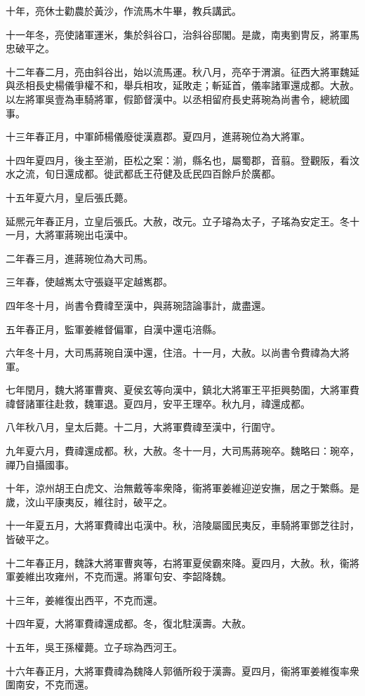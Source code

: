 \begin{pinyinscope}
十年，亮休士勸農於黃沙，作流馬木牛畢，教兵講武。

十一年冬，亮使諸軍運米，集於斜谷口，治斜谷邸閣。是歲，南夷劉冑反，將軍馬忠破平之。

十二年春二月，亮由斜谷出，始以流馬運。秋八月，亮卒于渭濵。征西大將軍魏延與丞相長史楊儀爭權不和，舉兵相攻，延敗走；斬延首，儀率諸軍還成都。大赦。以左將軍吳壹為車騎將軍，假節督漢中。以丞相留府長史蔣琬為尚書令，總統國事。

十三年春正月，中軍師楊儀廢徙漢嘉郡。夏四月，進蔣琬位為大將軍。

十四年夏四月，後主至湔，臣松之案：湔，縣名也，屬蜀郡，音翦。登觀阪，看汶水之流，旬日還成都。徙武都氐王苻健及氐民四百餘戶於廣都。

十五年夏六月，皇后張氏薨。

延熈元年春正月，立皇后張氏。大赦，改元。立子璿為太子，子瑤為安定王。冬十一月，大將軍蔣琬出屯漢中。

二年春三月，進蔣琬位為大司馬。

三年春，使越嶲太守張嶷平定越嶲郡。

四年冬十月，尚書令費禕至漢中，與蔣琬諮論事計，歲盡還。

五年春正月，監軍姜維督偏軍，自漢中還屯涪縣。

六年冬十月，大司馬蔣琬自漢中還，住涪。十一月，大赦。以尚書令費禕為大將軍。

七年閏月，魏大將軍曹爽、夏侯玄等向漢中，鎮北大將軍王平拒興勢圍，大將軍費禕督諸軍往赴救，魏軍退。夏四月，安平王理卒。秋九月，禕還成都。

八年秋八月，皇太后薨。十二月，大將軍費禕至漢中，行圍守。

九年夏六月，費禕還成都。秋，大赦。冬十一月，大司馬蔣琬卒。魏略曰：琬卒，禪乃自攝國事。

十年，涼州胡王白虎文、治無戴等率衆降，衞將軍姜維迎逆安撫，居之于繁縣。是歲，汶山平康夷反，維往討，破平之。

十一年夏五月，大將軍費禕出屯漢中。秋，涪陵屬國民夷反，車騎將軍鄧芝往討，皆破平之。

十二年春正月，魏誅大將軍曹爽等，右將軍夏侯霸來降。夏四月，大赦。秋，衞將軍姜維出攻雍州，不克而還。將軍句安、李韶降魏。

十三年，姜維復出西平，不克而還。

十四年夏，大將軍費禕還成都。冬，復北駐漢壽。大赦。

十五年，吳王孫權薨。立子琮為西河王。

十六年春正月，大將軍費禕為魏降人郭循所殺于漢壽。夏四月，衞將軍姜維復率衆圍南安，不克而還。


\end{pinyinscope}
